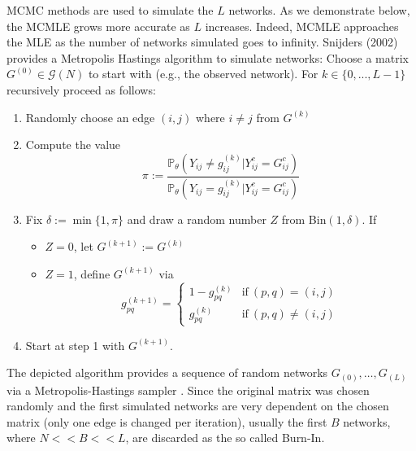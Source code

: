 \documentclass[10pt, conference, compsocconf]{IEEEtran}
\begin{document}
MCMC methods are used to simulate the $L$ networks. As we demonstrate below, the MCMLE grows more accurate as $L$ increases. Indeed, MCMLE approaches the MLE as the number of networks simulated goes to infinity. Snijders (2002) \cite{snijders2002markov} provides a Metropolis Hastings algorithm to simulate networks:
Choose a matrix $G^{(0)} \in \mathcal{G}(N)$ to start with (e.g., the observed network). For $k \in \{0,...,L-1\}$ recursively proceed as follows:\\
\begin{enumerate}
\item Randomly choose an edge $(i,j)$ where $i \neq j$ from $G^{(k)}$
\item Compute the value
$$\pi := \dfrac{\mathbb{P}_{\theta}(Y_{ij} \neq g_{ij}^{(k)} | Y_{ij}^c=G_{ij}^c)}{\mathbb{P}_{\theta}(Y_{ij}= g_{ij}^{(k)} | Y_{ij}^c=G_{ij}^c)}$$
\item Fix $\delta:= \min\{1, \pi\}$ and draw a random number $Z$ from Bin$(1, \delta)$. If
\begin{itemize}
\item $Z=0$, let $G^{(k+1)} := G^{(k)}$ 
\item $Z=1$, define $G^{(k+1)}$ via
$$g_{pq}^{(k+1)}=\begin{cases}
1-g_{pq}^{(k)}& \text{if}~ (p,q)=(i,j) \\
g_{pq}^{(k)} &\text{if}~ (p,q) \neq (i,j) 
\end{cases}$$
\end{itemize}
\item Start at step 1 with $G^{(k+1)}$.
\end{enumerate}
\vspace{0.3cm}
The depicted algorithm provides a sequence of random networks $G_(0),\dots,G_(L)$ via a Metropolis-Hastings sampler \cite{chib1995understanding}. Since the original matrix was chosen randomly and the first simulated networks are very dependent on the chosen matrix (only one edge is changed per iteration), usually
the first $B$ networks, where $N << B << L$, are discarded as the so called Burn-In.
\end{document}
